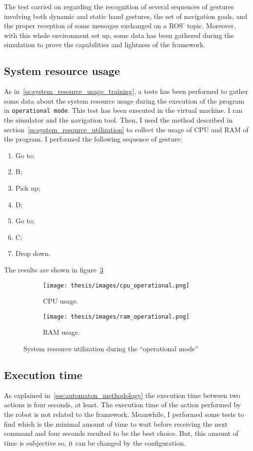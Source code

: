 \documentclass[../thesis.tex]{subfiles}
\begin{document}
The test carried on regarding the recognition of several sequences of gestures involving both dynamic and static hand gestures, the set of navigation goals, and the proper reception of some messages exchanged on a \gls{ROS}' topic. Moreover, with this whole environment set up, some data has been gathered during the simulation to prove the capabilities and lightness of the framework.

\subsection{System resource usage}
As in~\ref{ss:system_resource_usage_training}, a tests has been performed to gather some data about the system resource usage during the execution of the program in \texttt{operational mode}. This test has been executed in the virtual machine. I ran the simulator and the navigation tool. Then, I used the method described in section~\ref{ss:system_resource_utilization} to collect the usage of CPU and RAM of the program. I performed the following sequence of gesture:
\begin{enumerate}
    \item Go to;
    \item B;
    \item Pick up;
    \item D;
    \item Go to;
    \item C;
    \item Drop down.
\end{enumerate}
The results are shown in figure~\ref{fig:system_resource_graphs}

\begin{figure}[H]
    \centering
    \begin{subfigure}[b]{0.45\textwidth}
        \centering
        \texttt{[image: thesis/images/cpu\_operational.png]}
        \caption{CPU usage.}
        \label{fig:cpu_usage}
    \end{subfigure}
    \hfill
    \begin{subfigure}[b]{0.45\textwidth}
        \centering
        \texttt{[image: thesis/images/ram\_operational.png]}
        \caption{RAM usage.}
        \label{fig:ram_usage}
    \end{subfigure}
    \caption{System resource utilization during the ``operational mode''}
    \label{fig:system_resource_graphs}
\end{figure}

\subsection{Execution time}
As explained in~\ref{sss:automaton_methodology} the execution time between two actions is four seconds, at least. The execution time of the action performed by the robot is not related to the framework. Meanwhile, I performed some tests to find which is the minimal amount of time to wait before receiving the next command and four seconds resulted to be the best choice. But, this amount of time is subjective so, it can be changed by the configuration.
\end{document}
